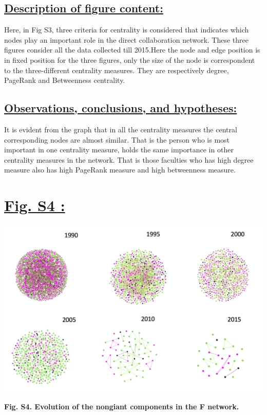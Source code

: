 \documentclass{article}\usepackage[]{graphicx}\usepackage[]{color}
\begin{document}
\subsection*{\underline{Description of figure content:}}
\par{Here, in Fig S3, three criteria for centrality is considered that indicates which nodes play an important role in the direct collaboration network. These three figures consider all the data collected till 2015.Here the node and edge position is in fixed position for the three figures, only the size of the node is correspondent to the three-different centrality measures. They are respectively degree, PageRank and Betweenness centrality.}
\subsection*{\underline{Observations, conclusions, and hypotheses:}}
\par{It is evident from the graph that in all the centrality measures the central corresponding nodes are almost similar. That is the person who is most important in one centrality measure, holds the same importance in other centrality measures in the network. That is those faculties who has high degree measure also has high PageRank measure and high betweenness measure.}

\newpage
\section*{\underline{Fig. S4 :}}
\begin{center}
\includegraphics[scale=0.6]{S4.png}
\newline
\par{\textbf{Fig. S4. Evolution of the nongiant components in the F network.}}
\end{center}
\end{document}
